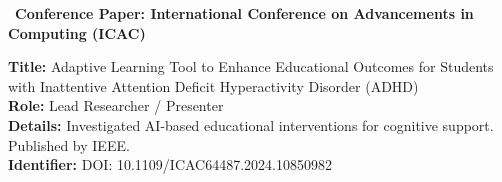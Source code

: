 
\vspace{2pt}
 \textbar\ \textbf{Conference Paper: International Conference on Advancements in Computing (ICAC)}\\[2pt]
{\small
\textbf{Title:} Adaptive Learning Tool to Enhance Educational Outcomes for Students with Inattentive Attention Deficit Hyperactivity Disorder (ADHD)\\
\textbf{Role:} Lead Researcher / Presenter\\
\textbf{Details:} Investigated AI-based educational interventions for cognitive support. Published by IEEE.\\
\textbf{Identifier:} DOI: 10.1109/ICAC64487.2024.10850982\par}
